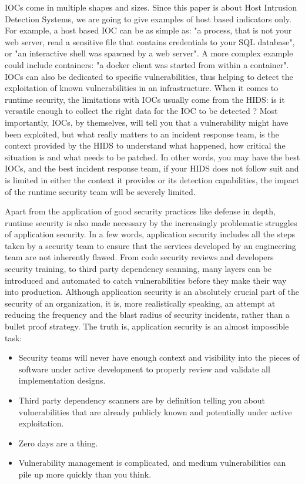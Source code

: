 IOCs come in multiple shapes and sizes.
Since this paper is about Host Intrusion Detection Systems, we are going to give examples of host based indicators only.
For example, a host based IOC can be as simple as: "a process, that is not your web server, read a sensitive file that contains credentials to your SQL database", or "an interactive shell was spawned by a web server".
A more complex example could include containers: "a docker client was started from within a container".
IOCs can also be dedicated to specific vulnerabilities, thus helping to detect the exploitation of known vulnerabilities in an infrastructure.
When it comes to runtime security, the limitations with IOCs usually come from the HIDS: is it versatile enough to collect the right data for the IOC to be detected ?
Most importantly, IOCs, by themselves, will tell you that a vulnerability might have been exploited, but what really matters to an incident response team, is the context provided by the HIDS to understand what happened, how critical the situation is and what needs to be patched.
In other words, you may have the best IOCs, and the best incident response team, if your HIDS does not follow suit and is limited in either the context it provides or its detection capabilities, the impact of the runtime security team will be severely limited.

Apart from the application of good security practices like defense in depth, runtime security is also made necessary by the increasingly problematic struggles of application security.
In a few words, application security includes all the steps taken by a security team to ensure that the services developed by an engineering team are not inherently flawed.
From code security reviews and developers security training, to third party dependency scanning, many layers can be introduced and automated to catch vulnerabilities before they make their way into production.
Although application security is an absolutely crucial part of the security of an organization, it is, more realistically speaking, an attempt at reducing the frequency and the blast radius of security incidents, rather than a bullet proof strategy.
The truth is, application security is an almost impossible task:

\begin{itemize}
  \item Security teams will never have enough context and visibility into the pieces of software under active development to properly review and validate all implementation designs.
  \item Third party dependency scanners are by definition telling you about vulnerabilities that are already publicly known and potentially under active exploitation.
  \item Zero days are a thing.
  \item Vulnerability management is complicated, and medium vulnerabilities can pile up more quickly than you think.
\end{itemize}

